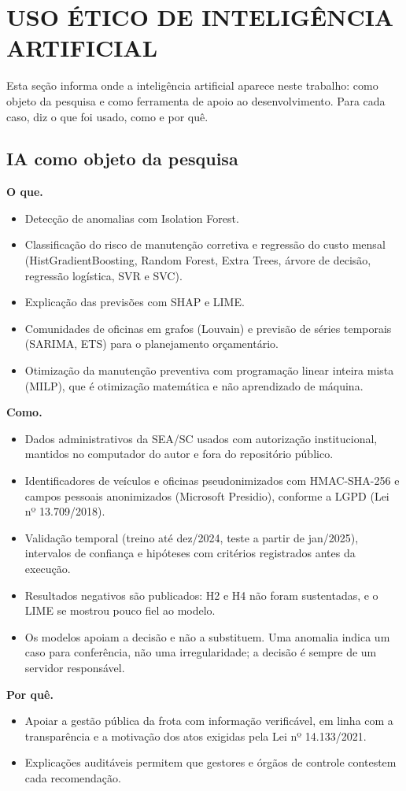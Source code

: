 \chapter{USO ÉTICO DE INTELIGÊNCIA ARTIFICIAL}
\label{sec:uso-etico-ia}
Esta seção informa onde a inteligência artificial aparece neste trabalho: como objeto da pesquisa e como ferramenta de apoio ao desenvolvimento. Para cada caso, diz o que foi usado, como e por quê.

\section{IA como objeto da pesquisa}
\textbf{O que.}
\begin{itemize}
  \item Detecção de anomalias com Isolation Forest.
  \item Classificação do risco de manutenção corretiva e regressão do custo mensal (HistGradientBoosting, Random Forest, Extra Trees, árvore de decisão, regressão logística, SVR e SVC).
  \item Explicação das previsões com SHAP e LIME.
  \item Comunidades de oficinas em grafos (Louvain) e previsão de séries temporais (SARIMA, ETS) para o planejamento orçamentário.
  \item Otimização da manutenção preventiva com programação linear inteira mista (MILP), que é otimização matemática e não aprendizado de máquina.
\end{itemize}
\textbf{Como.}
\begin{itemize}
  \item Dados administrativos da SEA/SC usados com autorização institucional, mantidos no computador do autor e fora do repositório público.
  \item Identificadores de veículos e oficinas pseudonimizados com HMAC-SHA-256 e campos pessoais anonimizados (Microsoft Presidio), conforme a LGPD (Lei nº 13.709/2018).
  \item Validação temporal (treino até dez/2024, teste a partir de jan/2025), intervalos de confiança e hipóteses com critérios registrados antes da execução.
  \item Resultados negativos são publicados: H2 e H4 não foram sustentadas, e o LIME se mostrou pouco fiel ao modelo.
  \item Os modelos apoiam a decisão e não a substituem. Uma anomalia indica um caso para conferência, não uma irregularidade; a decisão é sempre de um servidor responsável.
\end{itemize}
\textbf{Por quê.}
\begin{itemize}
  \item Apoiar a gestão pública da frota com informação verificável, em linha com a transparência e a motivação dos atos exigidas pela Lei nº 14.133/2021.
  \item Explicações auditáveis permitem que gestores e órgãos de controle contestem cada recomendação.
\end{itemize}
